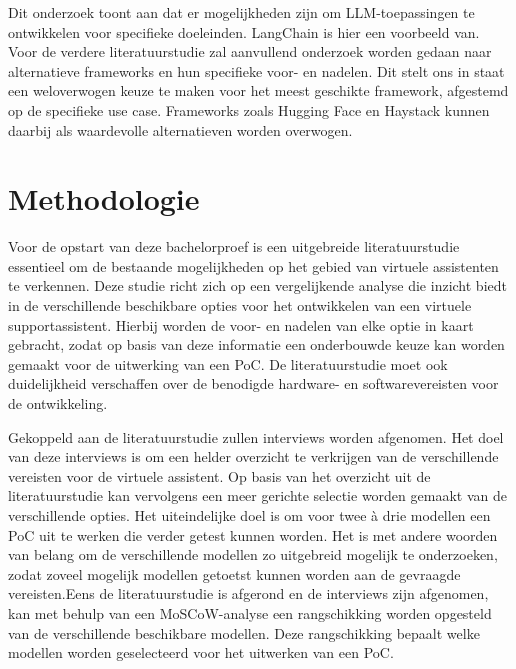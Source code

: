 Dit onderzoek toont aan dat er mogelijkheden zijn om LLM-toepassingen te ontwikkelen voor specifieke doeleinden. LangChain is hier een voorbeeld van. Voor de verdere literatuurstudie zal aanvullend onderzoek worden gedaan naar alternatieve frameworks en hun specifieke voor- en nadelen. Dit stelt ons in staat een weloverwogen keuze te maken voor het meest geschikte framework, afgestemd op de specifieke use case. Frameworks zoals Hugging Face en Haystack kunnen daarbij als waardevolle alternatieven worden overwogen.


\section{Methodologie}%
\label{sec:methodologie}

Voor de opstart van deze bachelorproef is een uitgebreide literatuurstudie essentieel om de bestaande mogelijkheden op het gebied van virtuele assistenten te verkennen. Deze studie richt zich op een vergelijkende analyse die inzicht biedt in de verschillende beschikbare opties voor het ontwikkelen van een virtuele supportassistent. Hierbij worden de voor- en nadelen van elke optie in kaart gebracht, zodat op basis van deze informatie een onderbouwde keuze kan worden gemaakt voor de uitwerking van een PoC. De literatuurstudie moet ook duidelijkheid verschaffen over de benodigde hardware- en softwarevereisten voor de ontwikkeling.

Gekoppeld aan de literatuurstudie zullen interviews worden afgenomen. Het doel van deze interviews is om een helder overzicht te verkrijgen van de verschillende vereisten voor de virtuele assistent. Op basis van het overzicht uit de literatuurstudie kan vervolgens een meer gerichte selectie worden gemaakt van de verschillende opties. Het uiteindelijke doel is om voor twee à drie modellen een PoC uit te werken die verder getest kunnen worden. Het is met andere woorden van belang om de verschillende modellen zo uitgebreid mogelijk te onderzoeken, zodat zoveel mogelijk modellen getoetst kunnen worden aan de gevraagde vereisten.Eens de literatuurstudie is afgerond en de interviews zijn afgenomen, kan met behulp van een MoSCoW-analyse een rangschikking worden opgesteld van de verschillende beschikbare modellen. Deze rangschikking bepaalt welke modellen worden geselecteerd voor het uitwerken van een PoC.

